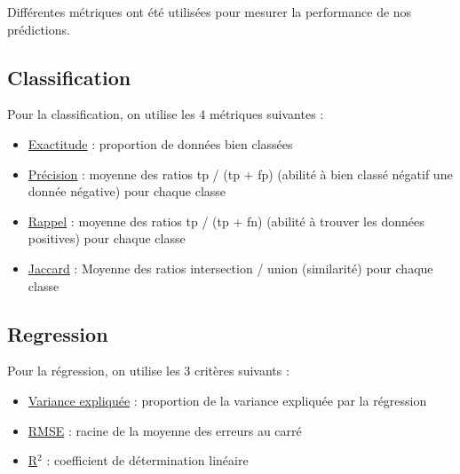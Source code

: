 \documentclass[twocolumns]{udes_rapport}
\begin{document}
    Différentes métriques ont été utilisées pour mesurer la performance de nos prédictions.
    
    \subsection{Classification}\label{subsec:metrics_clf}
    
        Pour la classification, on utilise les 4 métriques suivantes :
        \begin{itemize}
            \item \href{https://scikit-learn.org/stable/modules/generated/sklearn.metrics.accuracy_score.html}{Exactitude} : proportion de données bien classées
            
            \item \href{https://scikit-learn.org/stable/modules/generated/sklearn.metrics.precision_score.html}{Précision} : moyenne des ratios \textsf{tp / (tp + fp)} (abilité à bien classé négatif une donnée négative) pour chaque classe
            
            \item \href{https://scikit-learn.org/stable/modules/generated/sklearn.metrics.recall_score.html}{Rappel} : moyenne des ratios \textsf{tp / (tp + fn)} (abilité à trouver les données positives) pour chaque classe
            
            \item \href{https://scikit-learn.org/stable/modules/generated/sklearn.metrics.jaccard_score.html}{Jaccard} : Moyenne des ratios \textsf{intersection / union} (similarité) pour chaque classe
        \end{itemize}
    
    \subsection{Regression}\label{subsec:metrics_reg}
    
        Pour la régression, on utilise les 3 critères suivants :
        \begin{itemize}
            \item \href{https://scikit-learn.org/stable/modules/generated/sklearn.metrics.explained_variance_score.html}{Variance expliquée} : proportion de la variance expliquée par la régression
            
            \item \href{https://scikit-learn.org/stable/modules/generated/sklearn.metrics.mean_squared_error.html}{RMSE} : racine de la moyenne des erreurs au carré
            
            \item \href{https://scikit-learn.org/stable/modules/generated/sklearn.metrics.r2_score.html}{R$^2$} : coefficient de détermination linéaire
        \end{itemize}
\end{document}
